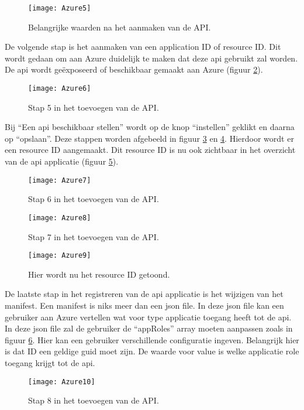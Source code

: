 \begin{figure}[H]
	\centering
	\texttt{[image: Azure5]} 
	\caption[Azure5]{Belangrijke waarden na het aanmaken van de API.}
	\label{fig:azure5}
\end{figure} 
De volgende stap is het aanmaken van een application ID of resource ID. Dit wordt gedaan om aan Azure duidelijk te maken dat deze api gebruikt zal worden. De api wordt geëxposeerd of beschikbaar gemaakt aan Azure (figuur \ref{fig:azure6}).
\begin{figure}[H]
	\centering
	\texttt{[image: Azure6]} 
	\caption[Azure6]{Stap 5 in het toevoegen van de API.}
	\label{fig:azure6}
\end{figure}
Bij “Een api beschikbaar stellen” wordt op de knop “instellen” geklikt en daarna op “opslaan”. Deze stappen worden afgebeeld in figuur \ref{fig:azure7} en \ref{fig:azure8}. Hierdoor wordt er een resource ID aangemaakt. Dit resource ID is nu ook zichtbaar in het overzicht van de api applicatie (figuur \ref{fig:azure9}).
\begin{figure}[H]
	\centering
	\texttt{[image: Azure7]} 
	\caption[Azure7]{Stap 6 in het toevoegen van de API.}
	\label{fig:azure7}
\end{figure}
\begin{figure}[H]
	\centering
	\texttt{[image: Azure8]} 
	\caption[Azure8]{Stap 7 in het toevoegen van de API.}
	\label{fig:azure8}
\end{figure}
\begin{figure}[H]
	\centering
	\texttt{[image: Azure9]} 
	\caption[Azure9]{Hier wordt nu het resource ID getoond.}
	\label{fig:azure9}
\end{figure}\newpage
De laatste stap in het registreren van de api applicatie is het wijzigen van het manifest. Een manifest is niks meer dan een json file. In deze json file kan een gebruiker aan Azure vertellen wat voor type applicatie toegang heeft tot de api. \newline
In deze json file zal de gebruiker de “appRoles” array moeten aanpassen zoals in figuur \ref{fig:azure10}. Hier kan een gebruiker verschillende configuratie ingeven. Belangrijk hier is dat ID een geldige guid moet zijn. De waarde voor value is welke applicatie role toegang krijgt tot de api.
\begin{figure}[H]
	\centering
	\texttt{[image: Azure10]} 
	\caption[Azure10]{Stap 8 in het toevoegen van de API.}
	\label{fig:azure10}
\end{figure}
